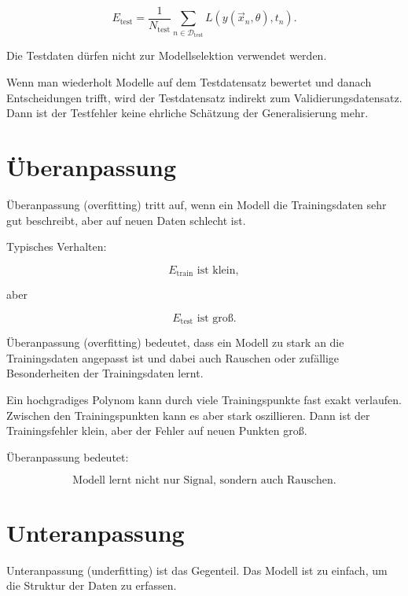 \[
    E_{\mathrm{test}}
    =
    \frac{1}{N_{\mathrm{test}}}
    \sum_{n\in\mathcal{D}_{\mathrm{test}}}
    L(y(\vec{x}_n,\theta),t_n).
\]

\begin{examtipbox}
Die Testdaten dürfen nicht zur Modellselektion verwendet werden.

Wenn man wiederholt Modelle auf dem Testdatensatz bewertet und danach Entscheidungen trifft, wird der Testdatensatz indirekt zum Validierungsdatensatz.
Dann ist der Testfehler keine ehrliche Schätzung der Generalisierung mehr.
\end{examtipbox}

\section{Überanpassung}

Überanpassung (overfitting) tritt auf, wenn ein Modell die Trainingsdaten sehr gut beschreibt, aber auf neuen Daten schlecht ist.

Typisches Verhalten:

\[
    E_{\mathrm{train}}
    \text{ ist klein},
\]

aber

\[
    E_{\mathrm{test}}
    \text{ ist groß}.
\]

\begin{definitionbox}
Überanpassung (overfitting) bedeutet, dass ein Modell zu stark an die Trainingsdaten angepasst ist und dabei auch Rauschen oder zufällige Besonderheiten der Trainingsdaten lernt.
\end{definitionbox}

\begin{examplebox}
Ein hochgradiges Polynom kann durch viele Trainingspunkte fast exakt verlaufen.
Zwischen den Trainingspunkten kann es aber stark oszillieren.
Dann ist der Trainingsfehler klein, aber der Fehler auf neuen Punkten groß.
\end{examplebox}

\begin{conceptbox}
Überanpassung bedeutet:

\[
    \text{Modell lernt nicht nur Signal, sondern auch Rauschen}.
\]
\end{conceptbox}

\section{Unteranpassung}

Unteranpassung (underfitting) ist das Gegenteil.
Das Modell ist zu einfach, um die Struktur der Daten zu erfassen.

